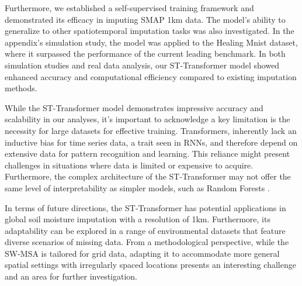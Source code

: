 \documentclass[11pt]{article}
\begin{document}
Furthermore, we established a self-supervised training framework and demonstrated its efficacy in imputing SMAP 1km data. The model's ability to generalize to other spatiotemporal imputation tasks was also investigated. In the appendix's simulation study, the model was applied to the Healing Mnist dataset, where it surpassed the performance of the current leading benchmark. In both simulation studies and real data analysis, our ST-Transformer model showed enhanced accuracy and computational efficiency compared to existing imputation methods. 

While the ST-Transformer model demonstrates impressive accuracy and scalability in our analyses, it's important to acknowledge a key limitation is the necessity for large datasets for effective training. Transformers, inherently lack an inductive bias for time series data, a trait seen in RNNs, and therefore depend on extensive data for pattern recognition and learning. This reliance might present challenges in situations where data is limited or expensive to acquire. Furthermore, the complex architecture of the ST-Transformer may not offer the same level of interpretability as simpler models, such as Random Forests \citet{breiman2001random}.


In terms of future directions, the ST-Transformer has potential applications in global soil moisture imputation with a resolution of 1km. Furthermore, its adaptability can be explored in a range of environmental datasets that feature diverse scenarios of missing data. From a methodological perspective, while the SW-MSA is tailored for grid data, adapting it to accommodate more general spatial settings with irregularly spaced locations presents an interesting challenge and an area for further investigation.




 
 
\end{document}
